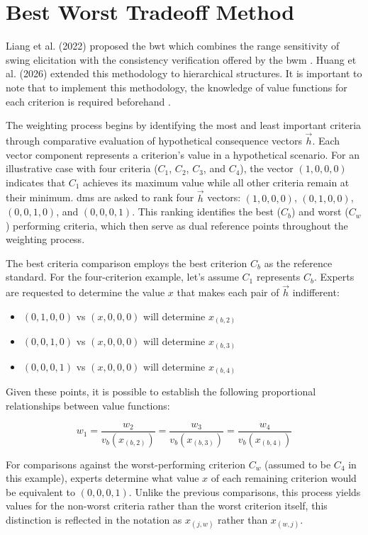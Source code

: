 \section{Best Worst Tradeoff Method}
\label{sec:bwt}
Liang et al. (2022) proposed the \gls{bwt} which combines the range sensitivity of swing elicitation with the consistency verification offered by the \gls{bwm} \cite{LIANG2022957}.  Huang et al. (2026) extended this methodology to hierarchical structures. It is important to note that to implement this methodology, the knowledge of value functions for each criterion is required beforehand \cite{Huang2026}.

The weighting process begins by identifying the most and least important criteria through comparative evaluation of hypothetical consequence vectors $\vec{h}$. Each vector component represents a criterion's value in a hypothetical scenario. For an illustrative case with four criteria ($C_1$, $C_2$, $C_3$, and $C_4$), the vector $(1,0,0,0)$ indicates that $C_1$ achieves its maximum value while all other criteria remain at their minimum. \glspl{dm} are asked to rank four $\vec{h}$ vectors: $(1,0,0,0)$, $(0,1,0,0)$, $(0,0,1,0)$, and $(0,0,0,1)$. This ranking identifies the best ($C_b$) and worst ($C_w$) performing criteria, which then serve as dual reference points throughout the weighting process. 

The best criteria comparison employs the best criterion $C_b$ as the reference standard. For the four-criterion example, let's assume $C_1$ represents $C_b$. Experts are requested to determine the value $x$ that makes each pair of $\vec{h}$ indifferent:

\begin{itemize}
\item $(0,1,0,0)$ vs $(x,0,0,0)$ will determine $x_{(b,2)}$
\item $(0,0,1,0)$ vs $(x,0,0,0)$ will determine $x_{(b,3)}$
\item $(0,0,0,1)$ vs $(x,0,0,0)$ will determine $x_{(b,4)}$
\end{itemize}

Given these points, it is possible to establish the following proportional relationships between value functions:

\begin{equation}
\label{eq:best_comparison}
w_1 = \frac{w_2}{v_b(x_{(b,2)})} = \frac{w_3}{v_b(x_{(b,3)})} = \frac{w_4}{v_b(x_{(b,4)})}
\end{equation}

For comparisons against the worst-performing criterion $C_w$ (assumed to be $C_4$ in this example), experts determine what value $x$ of each remaining criterion would be equivalent to $(0,0,0,1)$. Unlike the previous comparisons, this process yields values for the non-worst criteria rather than the worst criterion itself, this distinction is reflected in the notation as $x_{(j,w)}$ rather than $x_{(w,j)}$.

